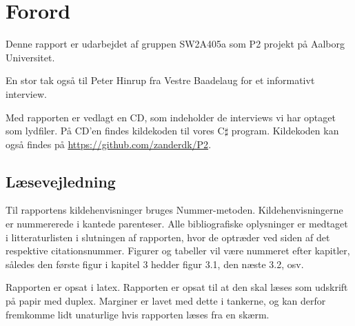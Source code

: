 \chapter*{Forord}
Denne rapport er udarbejdet af gruppen SW2A405a som P2 projekt på Aalborg Universitet.


En stor tak også til Peter Hinrup fra Vestre Baadelaug for et informativt interview.

Med rapporten er vedlagt en CD, som indeholder de interviews vi har optaget som lydfiler. På CD'en findes kildekoden til vores C$\sharp$ program. Kildekoden kan også findes på \url{https://github.com/zanderdk/P2}.


\section{Læsevejledning}
Til rapportens kildehenvisninger bruges Nummer-metoden. Kildehenvisningerne er nummererede i kantede parenteser. Alle bibliografiske oplysninger er medtaget i litteraturlisten i slutningen af rapporten, hvor de optræder ved siden af det respektive citationsnummer. Figurer og tabeller vil være nummeret efter kapitler, således den første figur i kapitel 3 hedder figur 3.1, den næste 3.2, osv.

Rapporten er opsat i latex. Rapporten er opsat til at den skal læses som udskrift på papir med duplex. Marginer er lavet med dette i tankerne, og kan derfor fremkomme lidt unaturlige hvis rapporten læses fra en skærm.